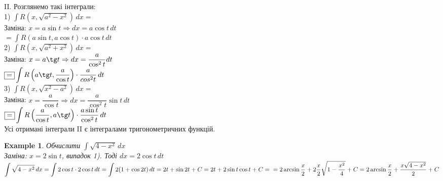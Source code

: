 \documentclass[a4paper, 10pt]{article}
\def\huge{\displaystyle}
\theoremstyle{theoremdd}
\theoremstyle{theoremdd}
\theoremstyle{theoremdd}
\theoremstyle{theoremdd}
\newtheorem{example}[theorem]{Example}
\theoremstyle{theoremdd}
\theoremstyle{theoremdd}
\theoremstyle{theoremdd}
\theoremstyle{theoremdd}
\begin{document}
II. Розглянемо такі інтеграли:\\
1) $\huge \int R(x,\sqrt{a^2-x^2})\,dx \boxed{=}$\\
Заміна: $x = a\sin t \Rightarrow dx = a\cos t \,dt$\\
$\boxed{=} \huge \int R(a\sin t, a\cos t) \cdot a\cos t \,dt$
\bigskip \\
2) $\huge \int R(x,\sqrt{a^2+x^2})\,dx \boxed{=}$\\
Заміна: $x = a\tg t \Rightarrow dx = \dfrac{a}{\cos^2 t} dt$\\
$\boxed{=} \huge \int R\left(a\tg t, \dfrac{a}{\cos t}\right) \cdot \dfrac{a}{cos^2 t} \,dt$
\bigskip \\

3) $\huge \int R(x, \sqrt{x^2-a^2})\,dx \boxed{=}$\\
Заміна: $x = \dfrac{a}{\cos t} \Rightarrow dx = \dfrac{a}{\cos^2 t} \sin t\,dt$\\
$\boxed{=} \huge \int R \left(\dfrac{a}{\cos t}, a \tg t \right) \cdot \dfrac{a \sin t}{\cos ^2 t}\,dt$
\bigskip \\

Усі отримані інтеграли II є інтегралами тригонометричних функцій.

\begin{example}
Обчислити $\huge \int \sqrt{4-x^2}\,dx$\\
Заміна: $x = 2\sin t$, випадок 1). Тоді $dx = 2 \cos t \,dt$\\
$\huge \int \sqrt{4-x^2}\,dx = \int 2 \cos t \cdot 2 \cos t \,dt = \int 2(1+\cos 2t)\,dt = 2t + \sin 2t + C = 2t + 2 \sin t \cos t + C = \\ = 2 \arcsin \frac{x}{2} + 2 \frac{x}{2} \sqrt{1-\frac{x^2}{4}}+C = 2 \arcsin \frac{x}{2} + \dfrac{x \sqrt{4-x^2}}{2} + C$
\end{example}
\end{document}
